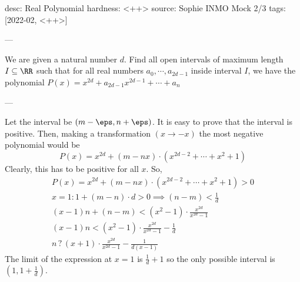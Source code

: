 desc: Real Polynomial
hardness: <++>
source: Sophie INMO Mock 2/3
tags: [2022-02, <++>]

---

We are given a natural number $d$. Find all open intervals of maximum
length $I \subseteq \RR$ such that for all real numbers $a_0, \cdots,
a_{2d-1}$ inside interval $I$, we have the polynomial $P(x) = x^{2d}
+a_{2d-1}x^{2d-1} + \cdots + a_n$

---

Let the interval be $(m-\eps,n+\eps)$. It is easy to prove that the
interval is positive. Then, making a transformation $(x \to -x)$ the most negative polynomial would be
\[
  P(x) = x^{2d} + (m - nx) \cdot \left( x^{2d-2} + \cdots+ x^2 + 1 \right)
\]
Clearly, this has to be positive for all $x$. So, 
\begin{align*}
  P(x) = x^{2d} + (m - nx) \cdot \left( x^{2d-2} + \cdots+ x^2 + 1 \right) > 0 \\
  x = 1: 1 + (m-n) \cdot d > 0 \implies (n-m) < \frac1{d} \\
  (x-1)n + (n-m) < (x^2 - 1) \cdot \frac{x^{2d}}{x^{2d} - 1} \\
  (x-1)n < (x^2 -1) \cdot \frac{x^{2d}}{x^{2d} - 1} - \frac1d \\
  n \operatorname{?} (x+1) \cdot \frac{x^{2d}}{x^{2d}-1} - \frac1{d(x-1)} 
\end{align*}
The limit of the expression at $x = 1$ is $\frac1d + 1$ so the only
possible interval is $(1,1+\frac1d)$.

